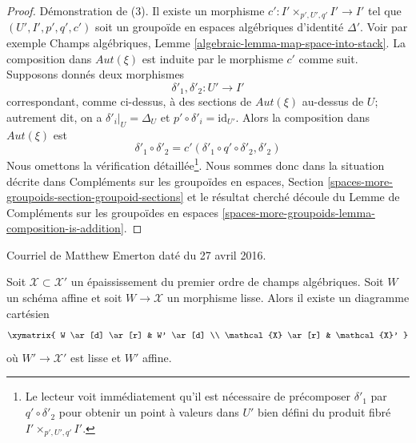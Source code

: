 \begin{proof}
\medskip\noindent
Démonstration de (3). Il existe un morphisme $c' : I' \times_{p', U', q'} I' \to I'$
tel que $(U', I', p', q', c')$ soit un groupoïde en espaces algébriques
d'identité $\Delta'$. Voir par exemple
Champs algébriques, Lemme \ref{algebraic-lemma-map-space-into-stack}.
La composition dans $\mathit{Aut}(\xi)$ est induite par le morphisme
$c'$ comme suit. Supposons donnés deux morphismes
$$
\delta'_1, \delta'_2 : U' \longrightarrow I'
$$
correspondant, comme ci-dessus, à des sections de $\mathit{Aut}(\xi)$ au-dessus de $U$;
autrement dit, on a $\delta'_i|_U = \Delta_U$ et
$p' \circ \delta'_i = \text{id}_{U'}$. Alors la composition
dans $\mathit{Aut}(\xi)$ est
$$
\delta'_1 \circ \delta'_2 = c'(\delta'_1 \circ q' \circ \delta'_2, \delta'_2)
$$
Nous omettons la vérification détaillée\footnote{Le lecteur voit immédiatement
qu'il est nécessaire de précomposer
$\delta'_1$ par $q' \circ \delta'_2$ pour obtenir un point à valeurs dans $U'$
bien défini du produit fibré $I' \times_{p', U', q'} I'$.}.
Nous sommes donc dans la situation décrite dans
Compléments sur les groupoïdes en espaces, Section
\ref{spaces-more-groupoids-section-groupoid-sections}
et le résultat cherché découle du
Lemme de Compléments sur les groupoïdes en espaces
\ref{spaces-more-groupoids-lemma-composition-is-addition}.
\end{proof}

\begin{proposition}[Emerton]
\label{proposition-affine-smooth-lift-to-first-order}
\begin{reference}
Courriel de Matthew Emerton daté du 27 avril 2016.
\end{reference}
Soit $\mathcal{X} \subset \mathcal{X}'$ un épaississement du premier ordre
de champs algébriques. Soit $W$ un schéma affine et soit
$W \to \mathcal{X}$ un morphisme lisse. Alors il existe
un diagramme cartésien
$$
\xymatrix{
W \ar[d] \ar[r] & W' \ar[d] \\
\mathcal{X} \ar[r] & \mathcal{X}'
}
$$
où $W' \to \mathcal{X}'$ est lisse et $W'$ affine.
\end{proposition}

